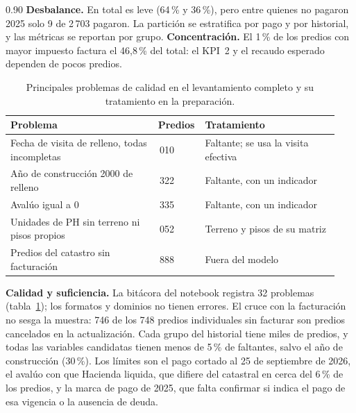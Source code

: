 \documentclass[12pt,letterpaper]{article}
\begin{document}
\begin{espacio}{0.90}
\textbf{Desbalance.} En total es leve (64\,\% y 36\,\%), pero entre quienes no pagaron 2025 solo
9 de 2\,703 pagaron. La partición se estratifica por pago y por historial, y las métricas se
reportan por grupo. \textbf{Concentración.} El 1\,\% de los predios con mayor impuesto factura el
46,8\,\% del total: el KPI~2 y el recaudo esperado dependen de pocos predios.

\begin{table}[H]
  \centering
  \caption{Principales problemas de calidad en el levantamiento completo y su tratamiento en la preparación.}
  \label{tab:calidad}
  \small
  \begin{tabular}{@{}>{\raggedright\arraybackslash}p{0.44\linewidth}
                     >{\raggedleft\arraybackslash}p{0.10\linewidth}
                     >{\raggedright\arraybackslash}p{0.40\linewidth}@{}}
    \toprule
    Problema & Predios & Tratamiento \\
    \midrule
    Fecha de visita de relleno, todas incompletas & 9\,010 & Faltante; se usa la visita efectiva \\
    Año de construcción 2000 de relleno & 3\,322 & Faltante, con un indicador \\
    Avalúo igual a 0 & 2\,335 & Faltante, con un indicador \\
    Unidades de PH sin terreno ni pisos propios & 11\,052 & Terreno y pisos de su matriz \\
    Predios del catastro sin facturación & 2\,888 & Fuera del modelo \\
    \bottomrule
  \end{tabular}
\end{table}

\textbf{Calidad y suficiencia.} La bitácora del notebook registra 32 problemas (tabla~\ref{tab:calidad});
los formatos y dominios no tienen errores. El cruce con la facturación no sesga la muestra: 746
de los 748 predios individuales sin facturar son predios cancelados en la actualización. Cada
grupo del historial tiene miles de predios, y todas las variables candidatas tienen menos de
5\,\% de faltantes, salvo el año de construcción (30\,\%). Los límites son el pago cortado al 25
de septiembre de 2026, el avalúo con que Hacienda liquida, que difiere del catastral en cerca del
6\,\% de los predios, y la marca de pago de 2025, que falta confirmar si indica el pago de esa
vigencia o la ausencia de deuda.

\end{espacio}
\end{document}
